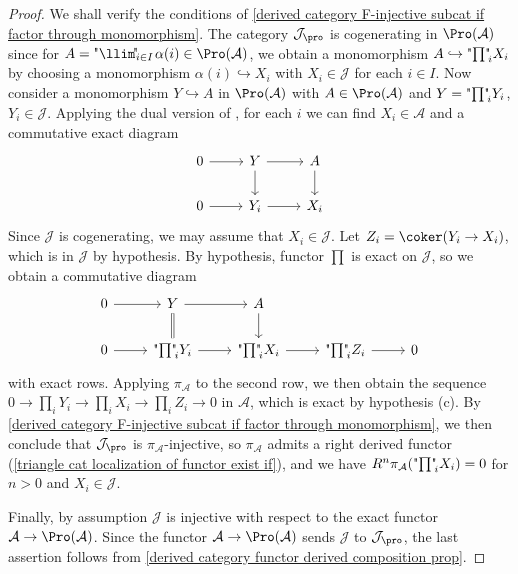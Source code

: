 \begin{proof}
We shall verify the conditions of \cref{derived category F-injective subcat if factor through monomorphism}. The category $\mathcal{J}_{\pro}$ is cogenerating in $\Pro(\mathcal{A})$ since for $A=\text{"$\llim$\!"}\!_{i\in I}\hspace*{1pt}\alpha(i)\in\Pro(\mathcal{A})$, we obtain a monomorphism $A\hookrightarrow\text{"$\prod$"\!}_iX_i$ by choosing a monomorphism $\alpha(i)\hookrightarrow X_i$ with $X_i\in\mathcal{J}$ for each $i\in I$. Now consider a monomorphism $Y\hookrightarrow A$ in $\Pro(\mathcal{A})$ with $A\in\Pro(\mathcal{A})$ and $Y=\text{"$\prod$"\!}_iY_i$, $Y_i\in\mathcal{J}$. Applying the dual version of \cite[proposition 8.6.9]{kashiwara_SAC}, for each $i$ we can find $X_i\in\mathcal{A}$ and a commutative exact diagram
\[\begin{tikzcd}
0\ar[r]&Y\ar[r]\ar[d]&A\ar[d]\\
0\ar[r]&Y_i\ar[r]&X_i
\end{tikzcd}\]
Since $\mathcal{J}$ is cogenerating, we may assume that $X_i\in\mathcal{J}$. Let $Z_i=\coker(Y_i\to X_i)$, which is in $\mathcal{J}$ by hypothesis. By hypothesis, functor $\prod$ is exact on $\mathcal{J}$, so we obtain a commutative diagram
\[\begin{tikzcd}
0\ar[r]&Y\ar[r]\ar[d,equal]&A\ar[d]\\
0\ar[r]&\text{"$\prod$"\!}_iY_i\ar[r]&\text{"$\prod$"\!}_iX_i\ar[r]&\text{"$\prod$"\!}_iZ_i\ar[r]&0
\end{tikzcd}\]
with exact rows. Applying $\pi_\mathcal{A}$ to the second row, we then obtain the sequence $0\to \prod_iY_i\to \prod_iX_i\to\prod_iZ_i\to 0$ in $\mathcal{A}$, which is exact by hypothesis (c). By \cref{derived category F-injective subcat if factor through monomorphism}, we then conclude that $\mathcal{J}_{\pro}$ is $\pi_\mathcal{A}$-injective, so $\pi_\mathcal{A}$ admits a right derived functor (\cref{triangle cat localization of functor exist if}), and we have $R^n\pi_\mathcal{A}(\text{"$\prod$"\!}_iX_i)=0$ for $n>0$ and $X_i\in\mathcal{J}$.\par
Finally, by assumption $\mathcal{J}$ is injective with respect to the exact functor $\mathcal{A}\to\Pro(\mathcal{A})$. Since the functor $\mathcal{A}\to\Pro(\mathcal{A})$ sends $\mathcal{J}$ to $\mathcal{J}_{\pro}$, the last assertion follows from \cref{derived category functor derived composition prop}.
\end{proof}

